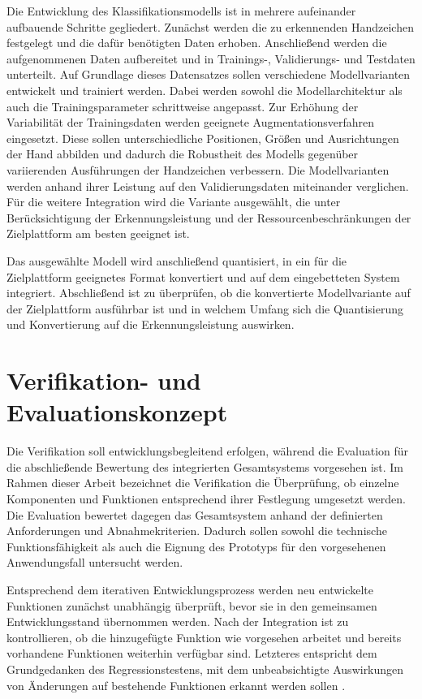 Die Entwicklung des Klassifikationsmodells ist in mehrere aufeinander aufbauende Schritte gegliedert. Zunächst werden die zu erkennenden Handzeichen festgelegt und die dafür benötigten Daten erhoben. Anschließend werden die aufgenommenen Daten aufbereitet und in Trainings-, Validierungs- und Testdaten unterteilt. Auf Grundlage dieses Datensatzes sollen verschiedene Modellvarianten entwickelt und trainiert werden. Dabei werden sowohl die Modellarchitektur als auch die Trainingsparameter schrittweise angepasst. Zur Erhöhung der Variabilität der Trainingsdaten werden geeignete Augmentationsverfahren eingesetzt. Diese sollen unterschiedliche Positionen, Größen und Ausrichtungen der Hand abbilden und dadurch die Robustheit des Modells gegenüber variierenden Ausführungen der Handzeichen verbessern. Die Modellvarianten werden anhand ihrer Leistung auf den Validierungsdaten miteinander verglichen. Für die weitere Integration wird die Variante ausgewählt, die unter Berücksichtigung der Erkennungsleistung und der Ressourcenbeschränkungen der Zielplattform am besten geeignet ist.

Das ausgewählte Modell wird anschließend quantisiert, in ein für die Zielplattform geeignetes Format konvertiert und auf dem eingebetteten System integriert. Abschließend ist zu überprüfen, ob die konvertierte Modellvariante auf der Zielplattform ausführbar ist und in welchem Umfang sich die Quantisierung und Konvertierung auf die Erkennungsleistung auswirken.

\section{Verifikation- und Evaluationskonzept}\label{sec:verifikation}

Die Verifikation soll entwicklungsbegleitend erfolgen, während die Evaluation für die abschließende Bewertung des integrierten Gesamtsystems vorgesehen ist. Im Rahmen dieser Arbeit bezeichnet die Verifikation die Überprüfung, ob einzelne Komponenten und Funktionen entsprechend ihrer Festlegung umgesetzt werden. Die Evaluation bewertet dagegen das Gesamtsystem anhand der definierten Anforderungen und Abnahmekriterien. Dadurch sollen sowohl die technische Funktionsfähigkeit als auch die Eignung des Prototyps für den vorgesehenen Anwendungsfall untersucht werden.

Entsprechend dem iterativen Entwicklungsprozess werden neu entwickelte Funktionen zunächst unabhängig überprüft, bevor sie in den gemeinsamen Entwicklungsstand übernommen werden. Nach der Integration ist zu kontrollieren, ob die hinzugefügte Funktion wie vorgesehen arbeitet und bereits vorhandene Funktionen weiterhin verfügbar sind. Letzteres entspricht dem Grundgedanken des Regressionstestens, mit dem unbeabsichtigte Auswirkungen von Änderungen auf bestehende Funktionen erkannt werden sollen \cite[S. 30]{ISTQBCertifiedTester}.

